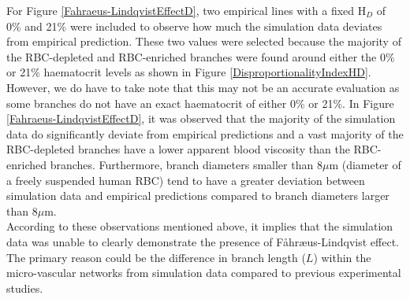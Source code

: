 \noindent For Figure \ref{Fahraeus-LindqvistEffectD}, two empirical lines with a fixed H$_{D}$ of 0\% and 21\% were included to observe how much the simulation data deviates from empirical prediction. These two values were selected because the majority of the RBC-depleted and RBC-enriched branches were found around either the 0\% or 21\% haematocrit levels as shown in Figure \ref{DisproportionalityIndexHD}. However, we do have to take note that this may not be an accurate evaluation as some branches do not have an exact haematocrit of either 0\% or 21\%. In Figure \ref{Fahraeus-LindqvistEffectD}, it was observed that the majority of the simulation data do significantly deviate from empirical predictions and a vast majority of the RBC-depleted branches have a lower apparent blood viscosity than the RBC-enriched branches. Furthermore, branch diameters smaller than 8$\mu$m (diameter of a freely suspended human RBC) tend to have a greater deviation between simulation data and empirical predictions compared to branch diameters larger than 8$\mu$m. \\

\noindent According to these observations mentioned above, it implies that the simulation data was unable to clearly demonstrate the presence of F{\aa}hr{\ae}us-Lindqvist effect. The primary reason could be the difference in branch length ($L$) within the micro-vascular networks from simulation data compared to previous experimental studies. 